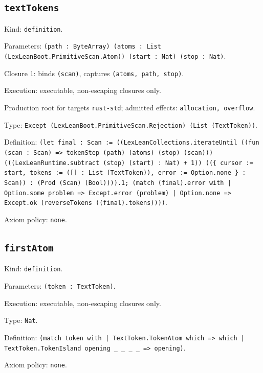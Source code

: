 \documentclass[11pt]{article}
\begin{document}
\subsection*{\texttt{textTokens}}
\noindent Kind: \texttt{definition}.\par
\noindent Parameters: \texttt{(path : ByteArray) (atoms : List (LexLeanBoot.PrimitiveScan.Atom)) (start : Nat) (stop : Nat)}.\par
\noindent Closure 1: binds \texttt{(scan)}, captures \texttt{(atoms, path, stop)}.\par
\noindent Execution: executable, non-escaping closures only.\par
\noindent Production root for targets \texttt{rust-std}; admitted effects: \texttt{allocation, overflow}.\par
\noindent Type: \texttt{Except (LexLeanBoot.PrimitiveScan.Rejection) (List (TextToken))}.\par
\noindent Definition: \texttt{(let final : Scan := ((LexLeanCollections.iterateUntil ((fun (scan : Scan) => tokenStep (path) (atoms) (stop) (scan))) (((LexLeanRuntime.subtract (stop) (start) : Nat) + 1)) ((\{ cursor := start, tokens := ([] : List (TextToken)), error := Option.none \} : Scan)) : (Prod (Scan) (Bool)))).1; (match (final).error with | Option.some problem => Except.error (problem) | Option.none => Except.ok (reverseTokens ((final).tokens))))}.\par
\noindent Axiom policy: \texttt{none}.\par
\subsection*{\texttt{firstAtom}}
\noindent Kind: \texttt{definition}.\par
\noindent Parameters: \texttt{(token : TextToken)}.\par
\noindent Execution: executable, non-escaping closures only.\par
\noindent Type: \texttt{Nat}.\par
\noindent Definition: \texttt{(match token with | TextToken.TokenAtom which => which | TextToken.TokenIsland opening \_ \_ \_ \_ => opening)}.\par
\noindent Axiom policy: \texttt{none}.\par
\end{document}
